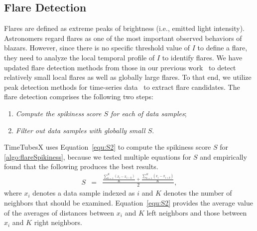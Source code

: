 \subsection{Flare Detection}\label{sec:flareDetection}
Flares are defined as extreme peaks of brightness (i.e., emitted light intensity). 
Astronomers regard flares as one of the most important observed behaviors of blazars.
However, since there is no specific threshold value of $I$ to define a flare, 
they need to analyze the local temporal profile of $I$ to identify flares.
We have updated flare detection methods from those in our previous work~\cite{Sawada2018}
to detect relatively small local flares as well as globally large flares.
To that end, we utilize peak detection methods for time-series data~\cite{Palshikar2009} to extract flare candidates. 
The flare detection comprises the following two steps:
\begin{enumerate}[nosep, label=\textsl{Step \arabic*}, align=parleft, leftmargin=*]
    \item \textsl{Compute the spikiness score $S$ for each of data samples}; \label{algo:flareSpikiness}
    \item \textsl{Filter out data samples with globally small $S$}. \label{algo:flareFilter}
\end{enumerate}
TimeTubesX uses Equation~\ref{equ:S2} to compute the spikiness score $S$ for \ref{algo:flareSpikiness},
because we tested multiple equations for $S$ and empirically found that the following produces the best results.
\begin{eqnarray}
    S &=& \frac{\frac{\sum_{k=1}^{K}(x_i - x_{i - k})}{K} + \frac{\sum_{k=1}^{K}(x_i - x_{i + k})}{K}}{2}\label{equ:S2},
\end{eqnarray}
where $x_i$ denotes a data sample indexed as $i$ and $K$ denotes the number of neighbors that should be examined.
Equation~\ref{equ:S2} provides the average value of the averages of distances between $x_i$ and $K$ left neighbors and those between $x_i$ and $K$ right neighbors.
